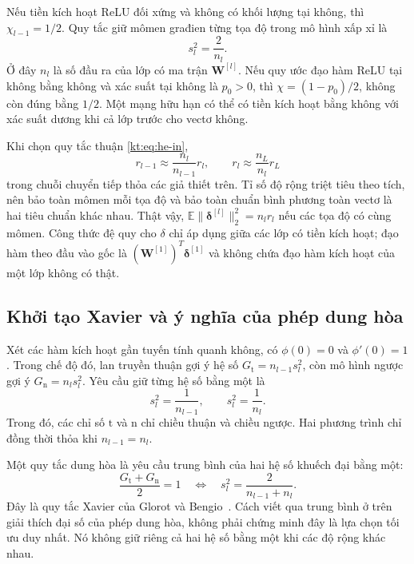 Nếu tiền kích hoạt ReLU đối xứng và không có khối lượng tại không,
thì $\chi_{l-1}=1/2$. Quy tắc giữ mômen građien từng tọa độ trong
mô hình xấp xỉ là
\begin{equation}
 \boxed{s_l^2=\frac2{n_l}.}
 \label{kt:eq:he-out}
\end{equation}
Ở đây $n_l$ là số đầu ra của lớp có ma trận $\mathbf W^{[l]}$.
Nếu quy ước đạo hàm ReLU tại không bằng không và xác suất tại
không là $p_0>0$, thì $\chi=(1-p_0)/2$, không còn đúng bằng
$1/2$. Một mạng hữu hạn có thể có tiền kích hoạt bằng không với
xác suất dương khi cả lớp trước cho vectơ không.

Khi chọn quy tắc thuận \eqref{kt:eq:he-in},
\begin{equation}
 r_{l-1}\approx\frac{n_l}{n_{l-1}}r_l,\qquad
 r_l\approx\frac{n_L}{n_l}r_L
 \label{kt:eq:width-telescope}
\end{equation}
trong chuỗi chuyển tiếp thỏa các giả thiết trên. Tỉ số độ rộng
triệt tiêu theo tích, nên bảo toàn mômen mỗi tọa độ và bảo toàn
chuẩn bình phương toàn vectơ là hai tiêu chuẩn khác nhau. Thật
vậy, $\mathbb E\|\boldsymbol\delta^{[l]}\|_2^2=n_lr_l$ nếu các
tọa độ có cùng mômen. Công thức đệ quy cho $\delta$ chỉ áp dụng
giữa các lớp có tiền kích hoạt; đạo hàm theo đầu vào gốc là
$(\mathbf W^{[1]})^T\boldsymbol\delta^{[1]}$ và không chứa đạo
hàm kích hoạt của một lớp không có thật.

\subsection{Khởi tạo Xavier và ý nghĩa của phép dung hòa}

Xét các hàm kích hoạt gần tuyến tính quanh không, có
$\phi(0)=0$ và $\phi'(0)=1$. Trong chế độ đó, lan truyền thuận
gợi ý hệ số $G_{\mathrm t}=n_{l-1}s_l^2$, còn mô hình ngược gợi
ý $G_{\mathrm n}=n_ls_l^2$. Yêu cầu giữ từng hệ số bằng một là
\begin{equation}
 s_l^2=\frac1{n_{l-1}},\qquad s_l^2=\frac1{n_l}.
 \label{kt:eq:xavier-two-conditions}
\end{equation}
Trong đó, các chỉ số $\mathrm t$ và $\mathrm n$ chỉ chiều thuận
và chiều ngược. Hai phương trình chỉ đồng thời thỏa khi
$n_{l-1}=n_l$.

Một quy tắc dung hòa là yêu cầu trung bình của hai hệ số khuếch
đại bằng một:
\begin{equation}
 \frac{G_{\mathrm t}+G_{\mathrm n}}2=1
 \quad\Longleftrightarrow\quad
 \boxed{s_l^2=\frac2{n_{l-1}+n_l}.}
 \label{kt:eq:xavier}
\end{equation}
Đây là quy tắc Xavier của Glorot và Bengio~\cite{glorot2010}.
Cách viết qua trung bình ở trên giải thích đại số của phép dung
hòa, không phải chứng minh đây là lựa chọn tối ưu duy nhất.
Nó không giữ riêng cả hai hệ số bằng một khi các độ rộng khác nhau.

